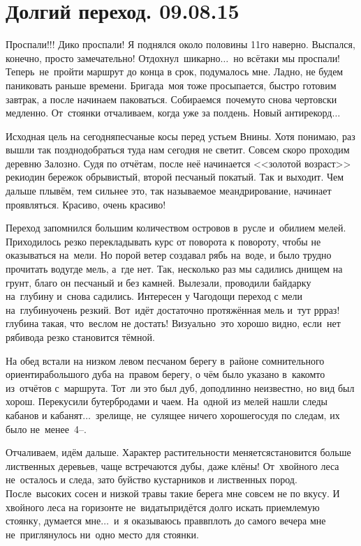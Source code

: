 \chapter{Долгий переход. 09.08.15}

Проспали!!! Дико проспали! Я поднялся около половины 11\sdash го наверно. Выспался, конечно, просто замечательно! Отдохнул~шикарно$\ldots$~но всё\sdash таки мы проспали! Теперь~не~пройти маршрут до конца в срок, подумалось мне. Ладно, не будем паниковать раньше времени. Бригада~моя тоже просыпается, быстро готовим завтрак, а после начинаем паковаться. Собираемся~почему\sdash то снова чертовски медленно. От~стоянки отчаливаем, когда уже за полдень. Новый антирекорд$\ldots$

Исходная цель на сегодня\mdash песчаные косы перед устьем Внины. Хотя понимаю, раз вышли так поздно\mdash добраться туда нам сегодня не светит. Совсем скоро проходим деревню Залозно. Судя по отчётам, после неё начинается <<золотой возраст>> реки\mdash один бережок обрывистый, второй песчаный покатый. Так и выходит. Чем дальше плывём, тем сильнее это, так называемое меандрирование, начинает проявляться. Красиво, очень красиво! 

Переход запомнился большим количеством островов в~русле и~обилием мелей. Приходилось резко перекладывать курс от поворота к повороту, чтобы не оказываться на~мели. Но порой ветер создавал рябь на~воде, и было трудно прочитать воду\mdash где мель, а~где нет. Так, несколько раз мы садились днищем на грунт, благо он песчаный и без камней. Вылезали, проводили байдарку на~глубину и~снова садились. Интересен у Чагодощи переход с мели на~глубину\mdash очень резкий. Вот~идёт достаточно протяжённая мель и~тут р\sdash р\sdash раз!\mdash глубина такая, что~веслом не достать! Визуально~это хорошо видно, если~нет ряби\mdash вода резко становится тёмной.

На обед встали на низком левом песчаном берегу в~районе сомнительного ориентира\mdash большого дуба на~правом берегу, о чём было указано в~каком\sdash то из~отчётов с~маршрута. Тот~ли это был дуб, доподлинно неизвестно, но вид был хорош. Перекусили бутербродами и чаем. На~одной из мелей нашли следы кабанов и кабанят$\ldots$~зрелище, не~сулящее ничего хорошего\mdash судя по следам, их было не~менее~4\thinspace--. 

Отчаливаем, идём дальше. Характер растительности меняется\mdash становится больше лиственных деревьев, чаще встречаются дубы, даже клёны! От~хвойного леса не~осталось и следа, зато буйство кустарников и лиственных пород. После~высоких сосен и низкой травы такие берега мне совсем не по вкусу. И хвойного леса на горизонте не~видать\mdash придётся долго искать приемлемую стоянку, думается мне$\ldots$~и~я оказываюсь прав\mdash вплоть до самого вечера мне не~приглянулось ни~одно место для стоянки.

